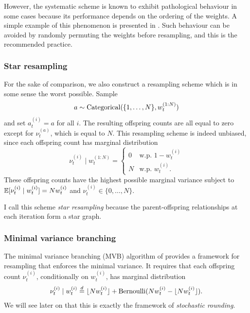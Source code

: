 However, the systematic scheme is known to exhibit pathological behaviour in some cases because its performance depends on the ordering of the weights. A simple example of this phenomenon is presented in \textcite{douc2005}. 
Such behaviour can be avoided by randomly permuting the weights before resampling, and this is the recommended practice. 



\subsubsection{Star resampling}
For the sake of comparison, we also construct a resampling scheme which is in some sense the worst possible.
Sample
\begin{equation*}
a \sim \operatorname{Categorical}( \{1,\dots, N\}, w_t^{(1:N)} )
\end{equation*}
and set $a_t^{(i)} = a$ for all $i$.
The resulting offspring counts are all equal to zero except for $\nu_t^{(a)}$, which is equal to $N$.
This resampling scheme is indeed unbiased, since each offspring count has marginal distribution
\begin{equation*}
\nu_t^{(i)}  \mid w_t^{(1:N)} 
= \begin{cases}
0 & \text{w.p. } 1-w_t^{(i)} \\
N & \text{w.p. } w_t^{(i)} .
\end{cases}
\end{equation*}
These offspring counts have the highest possible marginal variance subject to $\mathbb{E}[ \nu_t^{(i)}  \mid w_t^{(i)} ] = Nw_t^{(i)}$ and $\nu_t^{(i)} \in \{0,\dots,N\}$.

I call this scheme \emph{star resampling} because the parent-offspring relationships at each iteration form a star graph.


\subsubsection{Minimal variance branching}
The minimal variance branching (MVB) algorithm of \textcite{crisan1999} provides a framework for resampling that enforces the minimal variance. 
It requires that each offspring count $\nu_t^{(i)}$, conditionally on $w_t^{(i)}$, has marginal distribution
\begin{equation}\label{eq:branching_distn}
\nu_t^{(i)} \mid w_t^{(i)} \overset{d}{=} \lfloor N w_t^{(i)} \rfloor + \operatorname{Bernoulli}(Nw_t^{(i)} - \lfloor N w_t^{(i)} \rfloor) .
\end{equation}
We will see later on that this is exactly the framework of \emph{stochastic rounding}.

